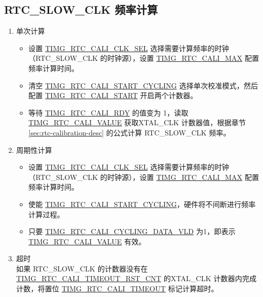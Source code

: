 \documentclass[main\_\_CN.tex]{subfiles}
\begin{document}
\subsection{RTC\_SLOW\_CLK 频率计算}\label{sec:rtc-calibration-procedure}
\begin{enumerate}
    \item 单次计算
    \begin{itemize}
        \item 设置 \hyperref[fielddesc:TIMGRTCCALICLKSEL]{TIMG\_RTC\_CALI\_CLK\_SEL} 选择需要计算频率的时钟（RTC\_SLOW\_CLK 的时钟源），设置 \hyperref[fielddesc:TIMGRTCCALIMAX]{TIMG\_RTC\_CALI\_MAX} 配置频率计算时间。
        \item 清空 \hyperref[fielddesc:TIMGRTCCALISTARTCYCLING]{TIMG\_RTC\_CALI\_START\_CYCLING} 选择单次校准模式，然后配置 \hyperref[fielddesc:TIMGRTCCALISTART]{TIMG\_RTC\_CALI\_START} 开启两个计数器。
        \item 等待 \hyperref[fielddesc:TIMGRTCCALIRDY]{TIMG\_RTC\_CALI\_RDY} 的值变为 1，读取\hyperref[fielddesc:TIMGRTCCALIVALUE]{TIMG\_RTC\_CALI\_VALUE} 获取XTAL\_CLK 计数器值，根据章节 \ref{sec:rtc-calibration-desc} 的公式计算 RTC\_SLOW\_CLK 频率。
    \end{itemize}
    \item 周期性计算
    \begin{itemize}
        \item 设置 \hyperref[fielddesc:TIMGRTCCALICLKSEL]{TIMG\_RTC\_CALI\_CLK\_SEL} 选择需要计算频率的时钟（RTC\_SLOW\_CLK 的时钟源），设置 \hyperref[fielddesc:TIMGRTCCALIMAX]{TIMG\_RTC\_CALI\_MAX} 配置频率计算时间。
        \item 使能 \hyperref[fielddesc:TIMGRTCCALISTARTCYCLING]{TIMG\_RTC\_CALI\_START\_CYCLING}，硬件将不间断进行频率计算过程。
        \item 只要 \hyperref[fielddesc:TIMGRTCCALICYCLINGDATAVLD]{TIMG\_RTC\_CALI\_CYCLING\_DATA\_VLD} 为1，即表示\hyperref[fielddesc:TIMGRTCCALIVALUE]{TIMG\_RTC\_CALI\_VALUE} 有效。
    \end{itemize}
    \item 超时\\
    如果 RTC\_SLOW\_CLK 的计数器没有在\hyperref[fielddesc:TIMGRTCCALITIMEOUTRSTCNT]{TIMG\_RTC\_CALI\_TIMEOUT\_RST\_CNT} 的XTAL\_CLK 计数器内完成计数，将置位 \hyperref[fielddesc:TIMGRTCCALITIMEOUT]{TIMG\_RTC\_CALI\_TIMEOUT} 标记计算超时。
\end{enumerate}


\end{document}
